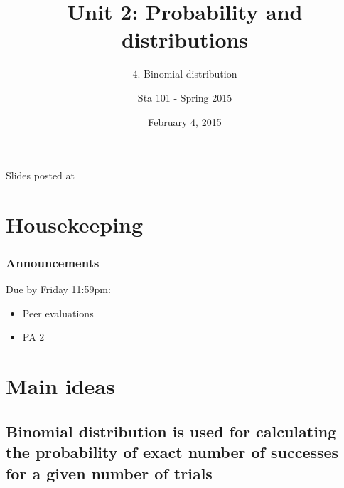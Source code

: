 \documentclass[slidestop,compress,mathserif,12pt,t,professionalfonts,xcolor=table]{beamer}
\title{Unit 2: Probability and distributions}
\subtitle{4. Binomial distribution}
\author{Sta 101 - Spring 2015}
\date{February 4, 2015}
\institute{Duke University, Department of Statistical Science}
\begin{document}



\begin{frame}[plain]

\titlepage
\vfill
{\scriptsize {} \hfill Slides posted at  \webLink{\CourseSite}{\CourseSite}}
\addtocounter{framenumber}{-1} 

\end{frame}


\section{Housekeeping}


\begin{frame}
\frametitle{Announcements}

Due by Friday 11:59pm:
\begin{itemize}

\item Peer evaluations

\item PA 2

\end{itemize}




\end{frame}


\section{Main ideas}


\subsection{Binomial distribution is used for calculating the probability of exact number of successes for a given number of trials}
\label{mi1}
\end{document}
